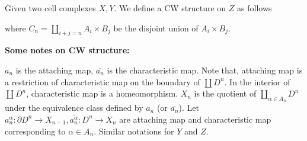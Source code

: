 \documentclass{article}
\begin{document}
Given two cell complexes $X, Y$. We define a CW structure on $Z$ as follows
\begin{center}
\end{center}

\begin{center}
\end{center}

where $C_n = \coprod_{i + j = n} A_i \times B_j$ be the disjoint union of $A_i \times B_j$.

\textbf{Some notes on CW structure:}

$a_n$ is the attaching map, $\overline{a_n}$ is the characteristic map. Note that, attaching map is a restriction of characteristic map on the boundary of $\coprod D^n$. In the interior of $\coprod D^n$, characteristic map is a homeomorphism. $X_n$ is the quotient of $\coprod_{\alpha \in A_n} D^n$ under the equivalence class defined by $a_n$ (or $\overline{a_n}$). Let $a_n^\alpha: \partial D^n \to X_{n-1}, \overline{a_n^\alpha}: D^n \to X_n$ are attaching map and characteristic map corresponding to $\alpha \in A_n$. Similar notations for $Y$ and $Z$.
\end{document}
